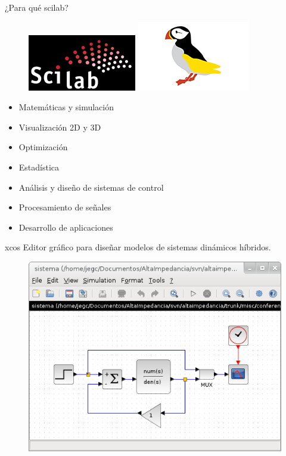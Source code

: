 \documentclass{beamer}
\begin{document}
\begin{frame}{¿Para qué scilab?}
  \begin{figure}
    \centering
    \includegraphics{scilab/img/Scilab-WebSite.png}
    \includegraphics{scilab/img/Puffin-Logo_medium}
  \end{figure}
  \begin{itemize}
  \item Matemáticas y simulación
  \item Visualización 2D y 3D
  \item Optimización
  \item Estadística
  \item Análisis y diseño de sistemas de control
  \item Procesamiento de señales
  \item Desarrollo de aplicaciones
  \end{itemize}
\end{frame}

\begin{frame}{xcos}
  Editor gráfico para diseñar modelos de sistemas dinámicos híbridos.
  \begin{figure}
    \centering
    \includegraphics[scale=0.6]{scilab/img/xcos.png}
  \end{figure}
\end{frame}
\end{document}
